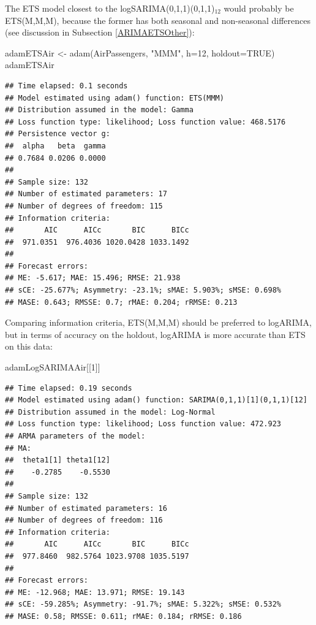 \documentclass[
]{book}
\newenvironment{Shaded}{\begin{snugshade}}{\end{snugshade}}
\newcommand{\AttributeTok}[1]{\textcolor[rgb]{0.77,0.63,0.00}{#1}}
\newcommand{\ConstantTok}[1]{\textcolor[rgb]{0.00,0.00,0.00}{#1}}
\newcommand{\DecValTok}[1]{\textcolor[rgb]{0.00,0.00,0.81}{#1}}
\newcommand{\FunctionTok}[1]{\textcolor[rgb]{0.00,0.00,0.00}{#1}}
\newcommand{\NormalTok}[1]{#1}
\newcommand{\OtherTok}[1]{\textcolor[rgb]{0.56,0.35,0.01}{#1}}
\newcommand{\StringTok}[1]{\textcolor[rgb]{0.31,0.60,0.02}{#1}}
\theoremstyle{definition}
\theoremstyle{definition}
\theoremstyle{definition}
\theoremstyle{definition}
\theoremstyle{remark}
\begin{document}
The ETS model closest to the logSARIMA(0,1,1)(0,1,1)\(_{12}\) would probably be ETS(M,M,M), because the former has both seasonal and non-seasonal differences (see discussion in Subsection \ref{ARIMAETSOther}):

\begin{Shaded}
\begin{Highlighting}[]
\NormalTok{adamETSAir }\OtherTok{\textless{}{-}} \FunctionTok{adam}\NormalTok{(AirPassengers, }\StringTok{"MMM"}\NormalTok{, }\AttributeTok{h=}\DecValTok{12}\NormalTok{, }\AttributeTok{holdout=}\ConstantTok{TRUE}\NormalTok{)}
\NormalTok{adamETSAir}
\end{Highlighting}
\end{Shaded}

\begin{verbatim}
## Time elapsed: 0.1 seconds
## Model estimated using adam() function: ETS(MMM)
## Distribution assumed in the model: Gamma
## Loss function type: likelihood; Loss function value: 468.5176
## Persistence vector g:
##  alpha   beta  gamma 
## 0.7684 0.0206 0.0000 
## 
## Sample size: 132
## Number of estimated parameters: 17
## Number of degrees of freedom: 115
## Information criteria:
##       AIC      AICc       BIC      BICc 
##  971.0351  976.4036 1020.0428 1033.1492 
## 
## Forecast errors:
## ME: -5.617; MAE: 15.496; RMSE: 21.938
## sCE: -25.677%; Asymmetry: -23.1%; sMAE: 5.903%; sMSE: 0.698%
## MASE: 0.643; RMSSE: 0.7; rMAE: 0.204; rRMSE: 0.213
\end{verbatim}

Comparing information criteria, ETS(M,M,M) should be preferred to logARIMA, but in terms of accuracy on the holdout, logARIMA is more accurate than ETS on this data:

\begin{Shaded}
\begin{Highlighting}[]
\NormalTok{adamLogSARIMAAir[[}\DecValTok{1}\NormalTok{]]}
\end{Highlighting}
\end{Shaded}

\begin{verbatim}
## Time elapsed: 0.19 seconds
## Model estimated using adam() function: SARIMA(0,1,1)[1](0,1,1)[12]
## Distribution assumed in the model: Log-Normal
## Loss function type: likelihood; Loss function value: 472.923
## ARMA parameters of the model:
## MA:
##  theta1[1] theta1[12] 
##    -0.2785    -0.5530 
## 
## Sample size: 132
## Number of estimated parameters: 16
## Number of degrees of freedom: 116
## Information criteria:
##       AIC      AICc       BIC      BICc 
##  977.8460  982.5764 1023.9708 1035.5197 
## 
## Forecast errors:
## ME: -12.968; MAE: 13.971; RMSE: 19.143
## sCE: -59.285%; Asymmetry: -91.7%; sMAE: 5.322%; sMSE: 0.532%
## MASE: 0.58; RMSSE: 0.611; rMAE: 0.184; rRMSE: 0.186
\end{verbatim}
\end{document}
